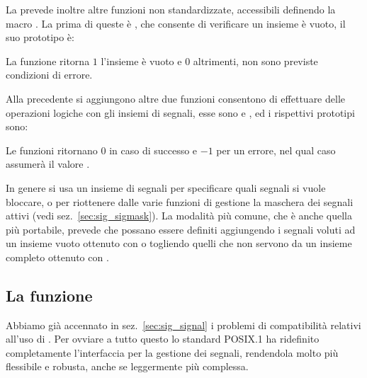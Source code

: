 La  prevede inoltre altre funzioni non standardizzate, accessibili
definendo la macro . La prima di queste è
, che consente di verificare un insieme è vuoto, il suo
prototipo è:

\begin{funcproto}{
}

{La funzione ritorna $1$ l'insieme è vuoto e $0$ altrimenti, non sono previste
  condizioni di errore.}
\end{funcproto}

Alla precedente si aggiungono altre due funzioni consentono di effettuare
delle operazioni logiche con gli insiemi di segnali, esse sono
 e , ed i rispettivi prototipi sono:

\begin{funcproto}{
}

{Le funzioni ritornano $0$ in caso di successo e $-1$ per un errore, nel qual
  caso  assumerà il valore .}
\end{funcproto}


In genere si usa un insieme di segnali per specificare quali segnali si vuole
bloccare, o per riottenere dalle varie funzioni di gestione la maschera dei
segnali attivi (vedi sez.~\ref{sec:sig_sigmask}). La modalità più comune, che
è anche quella più portabile, prevede che possano essere definiti aggiungendo
i segnali voluti ad un insieme vuoto ottenuto con  o
togliendo quelli che non servono da un insieme completo ottenuto con
.



\subsection{La funzione }
\label{sec:sig_sigaction}

Abbiamo già accennato in sez.~\ref{sec:sig_signal} i problemi di compatibilità
relativi all'uso di . Per ovviare a tutto questo lo standard
POSIX.1 ha ridefinito completamente l'interfaccia per la gestione dei segnali,
rendendola molto più flessibile e robusta, anche se leggermente più complessa.

